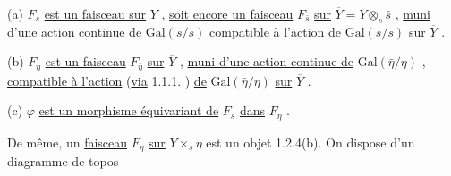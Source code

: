 (a) $F_s$ \underline{est un faisceau sur} $Y$ , \underline{soit encore un faisceau} $F_{\bar{s}}$ \underline{sur} $\overline{Y} = Y \otimes_s \bar{s}$ , \underline{muni d'une action continue de} $\mathrm{Gal}(\bar{s}/s)$ \underline{compatible à l'action de} $\mathrm{Gal}(\bar{s}/s)$ \underline{sur} $\overline{Y}$ .

(b) $F_\eta$ \underline{est un faisceau} $F_{\bar{\eta}}$ \underline{sur} $\overline{Y}$ , \underline{muni d'une action continue de} $\mathrm{Gal}(\bar{\eta}/\eta)$ , \underline{compatible à l'action} (\underline{via} 1.1.1. ) \underline{de} $\mathrm{Gal}(\bar{\eta}/\eta)$ \underline{sur} $\overline{Y}$ .

(c) $\varphi$ \underline{est un morphisme équivariant de} $F_{\bar{s}}$ \underline{dans} $F_{\bar{\eta}}$ .

De même, un \underline{faisceau} $F_\eta$ \underline{sur} $Y \times_s \eta$ est un objet 1.2.4(b). On dispose d'un diagramme de topos

